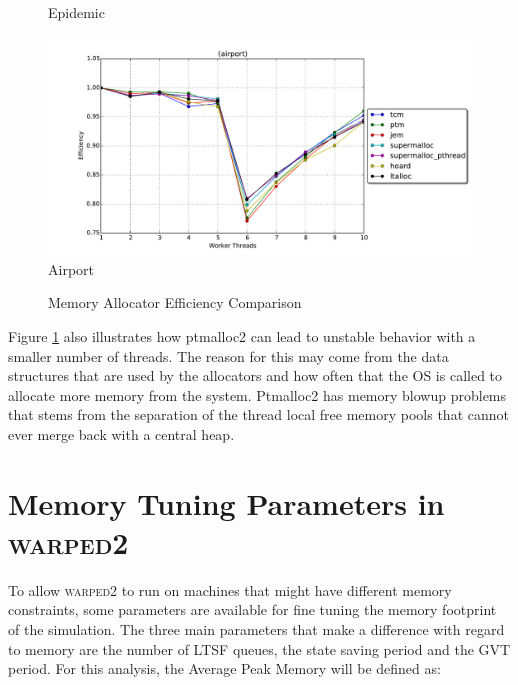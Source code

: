 \documentclass[11pt]{book}
\begin{document}
\begin{figure}
\begin{minipage}{.5\textwidth}
\begin{center}
      Epidemic \\
    \end{center}
  \end{minipage}%
  \begin{minipage}{.5\textwidth}
    \begin{center}
      \includegraphics[width=\textwidth,keepaspectratio,quiet]{figs/memory_allocation/airport_efficiency.pdf} \\
      Airport \\
    \end{center}
  \end{minipage}
  \caption{Memory Allocator Efficiency Comparison}\label{allocator_analysis_efficiency}
\end{figure}

Figure \ref{allocator_analysis_efficiency} also illustrates how ptmalloc2 can lead to unstable
behavior with a smaller number of threads.  The reason for this may come from the data structures
that are used by the allocators and how often that the OS is called to allocate more memory
from the system.  Ptmalloc2 has memory blowup problems that stems from the separation of the thread
local free memory pools that cannot ever merge back with a central heap.

\section{Memory Tuning Parameters in \textsc{warped2}}

To allow \textsc{warped2} to run on machines that might have different memory constraints,
some parameters are available for fine tuning the memory footprint of the simulation.  The
three main parameters that make a difference with regard to memory are the number of LTSF queues,
the state saving period and the GVT period.  For this analysis, the Average Peak Memory will be
defined as:
\end{document}
